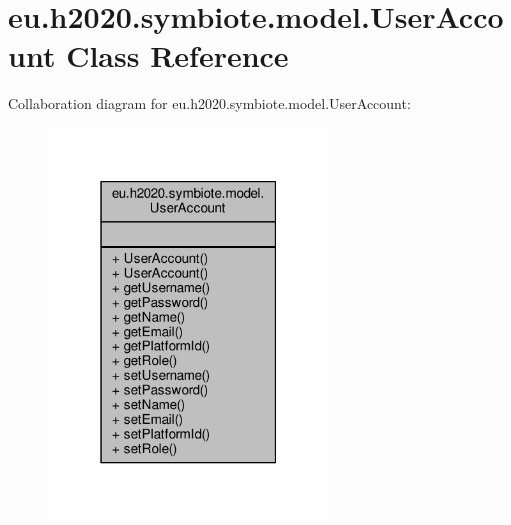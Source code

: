 \hypertarget{classeu_1_1h2020_1_1symbiote_1_1model_1_1UserAccount}{}\section{eu.\+h2020.\+symbiote.\+model.\+User\+Account Class Reference}
\label{classeu_1_1h2020_1_1symbiote_1_1model_1_1UserAccount}


Collaboration diagram for eu.\+h2020.\+symbiote.\+model.\+User\+Account\+:
\nopagebreak
\begin{figure}[H]
\begin{center}
\leavevmode
\includegraphics[width=211pt]{classeu_1_1h2020_1_1symbiote_1_1model_1_1UserAccount__coll__graph}
\end{center}
\end{figure}
